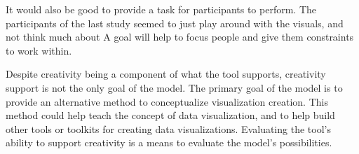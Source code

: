 It would also be good to provide a task for participants to perform.
The participants of the last study seemed to just play around with the visuals, and not think much about 
A goal will help to focus people and give them constraints to work within.

Despite creativity being a component of what the tool supports, creativity support is not the only goal of the model.
The primary goal of the model is to provide an alternative method to conceptualize visualization creation.
This method could help teach the concept of data visualization, and to help build other tools or toolkits for creating data visualizations.
Evaluating the tool's ability to support creativity is a means to evaluate the model's possibilities.